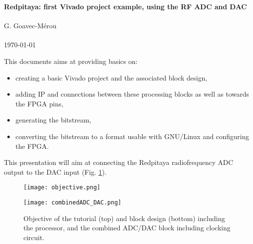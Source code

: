 \documentclass[10pt,oneside]{article}
\begin{document}
\begin{center}
{\bf \Large Redpitaya: first Vivado project example, using the RF ADC and DAC} \\ \ \\
G. Goavec-M\'erou \\ \ \\ \today
\end{center}

This documents aims at providing basics on:
\begin{itemize}
\setlength\itemsep{0em}
\item creating a basic Vivado project and the associated block design,
\item adding IP and connections between these processing blocks as well as towards the FPGA pins,
\item generating the bitstream,
\item converting the bitstream to a format usable with GNU/Linux and configuring the FPGA.
\end{itemize}

This presentation will aim at connecting the Redpitaya radiofrequency ADC 
output to the DAC input (Fig. \ref{bloc_design_final}).

\begin{figure}[h!tb]
\begin{center}
\texttt{[image: objective.png]}
\end{center}
\hspace{-1cm}\texttt{[image: combinedADC\_DAC.png]}
\caption{Objective of the tutorial (top) and block design (bottom) including the processor, and
the combined ADC/DAC block including clocking circuit.}
\label{bloc_design_final}
\end{figure}

%

\end{document}
